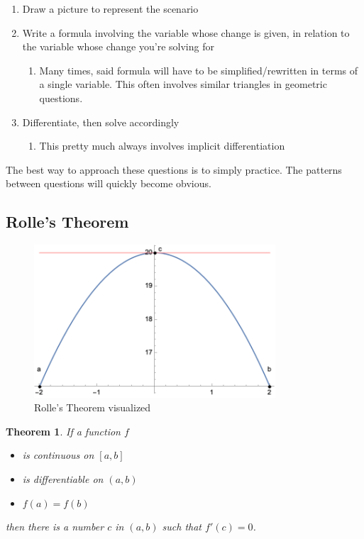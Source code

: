 \documentclass[12pt]{article}
\newtheorem{theorem}{Theorem}
\begin{document}
\begin{enumerate}
    \item Draw a picture to represent the scenario
    \item Write a formula involving the variable whose change is given, in relation to the variable whose change you're solving for
    \begin{enumerate}
        \item Many times, said formula will have to be simplified/rewritten in terms of a single variable. This often involves similar triangles in geometric questions.
    \end{enumerate}
    \item Differentiate, then solve accordingly
    \begin{enumerate}
        \item This pretty much always involves implicit differentiation
    \end{enumerate}
\end{enumerate}

The best way to approach these questions is to simply practice. The patterns between questions will quickly become obvious.
\subsection{Rolle's Theorem}
\begin{figure}[!ht]
    \centering
    \includegraphics[width=9cm]{misc/rolles.png}
    \caption{Rolle's Theorem visualized}
    \label{fig:rolles}
\end{figure}

\begin{theorem}
If a function $f$
\begin{itemize}
    \item is \textit{continuous} on $[a,b]$
    \item is \textit{differentiable} on $(a,b)$
    \item $f(a) = f(b)$
\end{itemize}
then there is a number $c$ in $(a,b)$ such that $f'(c) = 0$.
\end{theorem}
\end{document}
